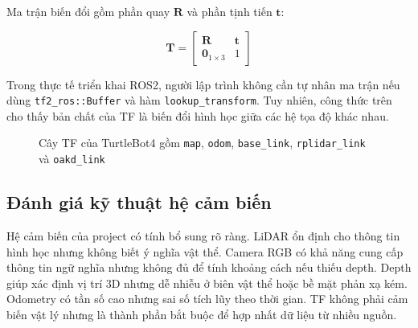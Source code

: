 Ma trận biến đổi gồm phần quay $\mathbf{R}$ và phần tịnh tiến $\mathbf{t}$:

\begin{equation}
    \mathbf{T}
    =
    \begin{bmatrix}
        \mathbf{R} & \mathbf{t} \\
        \mathbf{0}_{1\times 3} & 1
    \end{bmatrix}
    \label{eq:homogeneous-transform}
\end{equation}

Trong thực tế triển khai ROS2, người lập trình không cần tự nhân ma trận nếu dùng \texttt{tf2\_ros::Buffer} và hàm \texttt{lookup\_transform}. Tuy nhiên, công thức trên cho thấy bản chất của TF là biến đổi hình học giữa các hệ tọa độ khác nhau.

\begin{figure}[H]
\centering
{}
\caption{Cây TF của TurtleBot4 gồm \texttt{map}, \texttt{odom}, \texttt{base\_link}, \texttt{rplidar\_link} và \texttt{oakd\_link}}
\label{fig:turtlebot4-tf-tree}
\end{figure}

\subsection{Đánh giá kỹ thuật hệ cảm biến}
\label{subsec:sensor-technical-assessment}

Hệ cảm biến của project có tính bổ sung rõ ràng. LiDAR ổn định cho thông tin hình học nhưng không biết ý nghĩa vật thể. Camera RGB có khả năng cung cấp thông tin ngữ nghĩa nhưng không đủ để tính khoảng cách nếu thiếu depth. Depth giúp xác định vị trí 3D nhưng dễ nhiễu ở biên vật thể hoặc bề mặt phản xạ kém. Odometry có tần số cao nhưng sai số tích lũy theo thời gian. TF không phải cảm biến vật lý nhưng là thành phần bắt buộc để hợp nhất dữ liệu từ nhiều nguồn.

